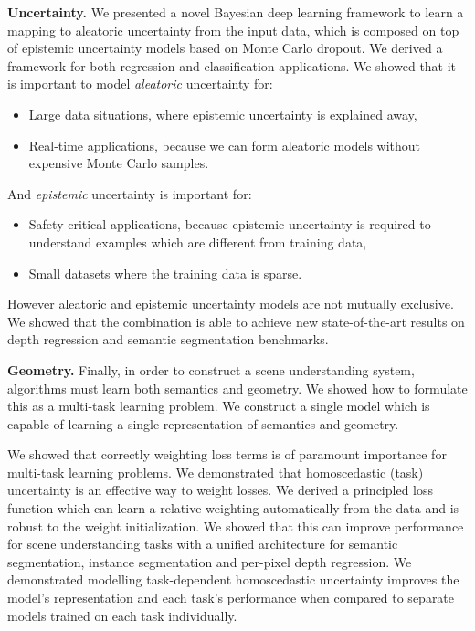 \textbf{Uncertainty.}
We presented a novel Bayesian deep learning framework to learn a mapping to aleatoric uncertainty from the input data, which is composed on top of epistemic uncertainty models based on Monte Carlo dropout. We derived a framework for both regression and classification applications. We showed that it is important to model \textit{aleatoric} uncertainty for:
\begin{itemize}
\item Large data situations, where epistemic uncertainty is explained away,
\item Real-time applications, because we can form aleatoric models without expensive Monte Carlo samples.
\end{itemize}
And \textit{epistemic} uncertainty is important for:
\begin{itemize}
\item Safety-critical applications, because epistemic uncertainty is required to understand examples which are different from training data,
\item Small datasets where the training data is sparse.
\end{itemize}

However aleatoric and epistemic uncertainty models are not mutually exclusive. We showed that the combination is able to achieve new state-of-the-art results on depth regression and semantic segmentation benchmarks.

\textbf{Geometry.}
Finally, in order to construct a scene understanding system, algorithms must learn both semantics and geometry. We showed how to formulate this as a multi-task learning problem. We construct a single model which is capable of learning a single representation of semantics and geometry. 

We showed that correctly weighting loss terms is of paramount importance for multi-task learning problems. We demonstrated that homoscedastic (task) uncertainty is an effective way to weight losses. We derived a principled loss function which can learn a relative weighting automatically from the data and is robust to the weight initialization. We showed that this can improve performance for scene understanding tasks with a unified architecture for semantic segmentation, instance segmentation and per-pixel depth regression. We demonstrated modelling task-dependent homoscedastic uncertainty improves the model's representation and each task's performance when compared to separate models trained on each task individually.

